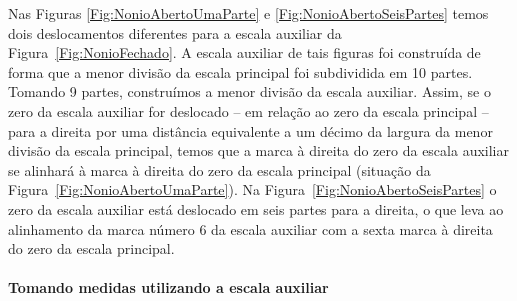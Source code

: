 Nas Figuras \ref{Fig:NonioAbertoUmaParte} e \ref{Fig:NonioAbertoSeisPartes} temos dois deslocamentos diferentes para a escala auxiliar da Figura~\ref{Fig:NonioFechado}. A escala auxiliar de tais figuras foi construída de forma que a menor divisão da escala principal foi subdividida em 10 partes. Tomando 9 partes, construímos a menor divisão da escala auxiliar. Assim, se o zero da escala auxiliar for deslocado -- em relação ao zero da escala principal -- para a direita por uma distância equivalente a um décimo da largura da menor divisão da escala principal, temos que a marca à direita do zero da escala auxiliar se alinhará à marca à direita do zero da escala principal (situação da Figura~\ref{Fig:NonioAbertoUmaParte}). Na Figura~\ref{Fig:NonioAbertoSeisPartes} o zero da escala auxiliar está deslocado em seis partes para a direita, o que leva ao alinhamento da marca número 6 da escala auxiliar com a sexta marca à direita do zero da escala principal.

\paragraph{Tomando medidas utilizando a escala auxiliar}

